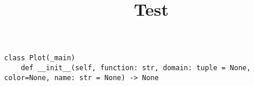\documentclass{article}
\title{Test}
\date{}
\begin{document}
\maketitle
\lstset{language=python}
\begin{lstlisting}
class Plot(_main)
	def __init__(self, function: str, domain: tuple = None, color=None, name: str = None) -> None
\end{lstlisting}
\end{document}
